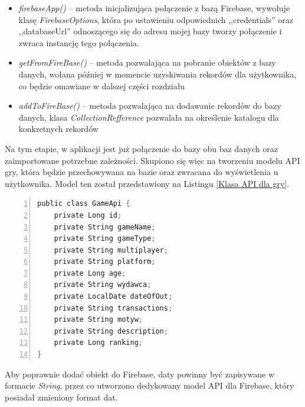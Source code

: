 \begin{itemize}
\item \textit{firebaseApp()} -- metoda inicjalizująca połączenie z bazą Firebase, wywołuje klasę \textit{FirebaseOptions}, która po ustawieniu odpowiednich ,,credentials'' oraz ,,databaseUrl'' odnoszącego się do adresu mojej bazy tworzy połączenie i zwraca instancję tego połączenia.

\item \textit{getFromFireBase()} -- metoda pozwalająca na pobranie obiektów z bazy danych, wołana później w momencie uzyskiwania rekordów dla użytkownika, co będzie omawiane w dalszej części rozdziału

\item \textit{addToFireBase()} -- metoda pozwalająca na dodawanie rekordów do bazy danych, klasa \textit{CollectionRefference} pozwalała na określenie katalogu dla konkretnych rekordów 
\end{itemize}

Na tym etapie, w aplikacji jest już połączenie do bazy obu baz danych oraz zaimportowane potrzebne zależności. Skupiono  się więc na tworzeniu modelu API gry, która będzie przechowywana na bazie oraz zwracana do wyświetlenia u użytkownika. Model ten został przedstawiony na Listingu \ref{Klasa API dla gry}.
\begin{lstlisting}[language=C, mathescape, frame=single, numbers=left, xleftmargin=2em, framexleftmargin=2em, basicstyle=\ttfamily\bfseries, caption={Klasa API dla gry}, label={Klasa API dla gry}]
public class GameApi {
    private Long id;
    private String gameName;
    private String gameType;
    private String multiplayer;
    private String platform;
    private Long age;
    private String wydawca;
    private LocalDate dateOfOut;
    private String transactions;
    private String motyw;
    private String description;
    private Long ranking;
}
\end{lstlisting}

Aby poprawnie dodać obiekt do Firebase, daty powinny być zapisywane w formacie \textit{String}, przez co utworzono dedykowany model API dla Firebase, który posiadał zmieniony format dat.

